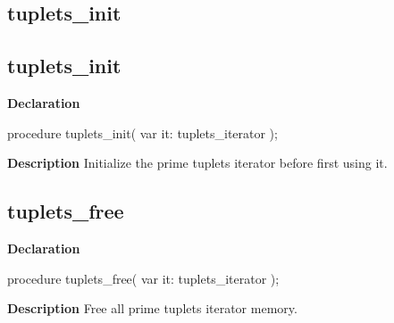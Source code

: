 \documentclass{report}
\newif\ifpdf
\begin{document}
\subsection*{\large{\textbf{tuplets{\_}init}}\normalsize\hspace{1ex}\hrulefill}
\else
\subsection*{tuplets{\_}init}
\fi
\label{primesieve-tuplets_init}
\begin{list}{}{
\setlength{\itemindent}{0cm}
\setlength{\listparindent}{0cm}
\setlength{\leftmargin}{\evensidemargin}
\addtolength{\leftmargin}{\tmplength}
\settowidth{\labelsep}{X}
\addtolength{\leftmargin}{\labelsep}
\setlength{\labelwidth}{\tmplength}
}
\item[\textbf{Declaration}\hfill]
\ifpdf
\begin{flushleft}
\fi
\begin{ttfamily}
procedure tuplets{\_}init( var it: tuplets{\_}iterator );\end{ttfamily}

\ifpdf
\end{flushleft}
\fi

\par
\item[\textbf{Description}]
Initialize the prime tuplets iterator before first using it.

\end{list}
\ifpdf
\subsection*{\large{\textbf{tuplets{\_}free}}\normalsize\hspace{1ex}\hrulefill}
\else
\subsection*{tuplets{\_}free}
\fi
\label{primesieve-tuplets_free}
\begin{list}{}{
\setlength{\itemindent}{0cm}
\setlength{\listparindent}{0cm}
\setlength{\leftmargin}{\evensidemargin}
\addtolength{\leftmargin}{\tmplength}
\settowidth{\labelsep}{X}
\addtolength{\leftmargin}{\labelsep}
\setlength{\labelwidth}{\tmplength}
}
\item[\textbf{Declaration}\hfill]
\ifpdf
\begin{flushleft}
\fi
\begin{ttfamily}
procedure tuplets{\_}free( var it: tuplets{\_}iterator );\end{ttfamily}

\ifpdf
\end{flushleft}
\fi

\par
\item[\textbf{Description}]
Free all prime tuplets iterator memory.

\end{list}
\ifpdf
\end{document}

